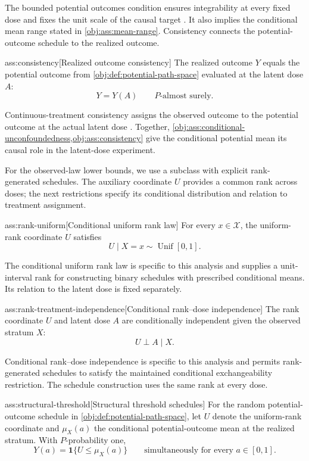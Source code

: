 \documentclass[11pt]{article}
\begin{document}
The bounded potential outcomes condition ensures integrability at every fixed dose and fixes the unit scale of the causal target \citep{HuangZhang2023}. It also implies the conditional mean range stated in \cref{obj:ass:mean-range}. Consistency connects the potential-outcome schedule to the realized outcome.

\begin{assumptionv}{ass:consistency}[Realized outcome consistency]
The realized outcome \(Y\) equals the potential outcome from \cref{obj:def:potential-path-space} evaluated at the latent dose \(A\):
\[
Y=Y(A)\qquad P\text{-almost surely}.
\]
\end{assumptionv}

Continuous-treatment consistency assigns the observed outcome to the potential outcome at the actual latent dose \citep{HuangZhang2023}. Together, \cref{obj:ass:conditional-unconfoundedness,obj:ass:consistency} give the conditional potential mean its causal role in the latent-dose experiment.

For the observed-law lower bounds, we use a subclass with explicit rank-generated schedules. The auxiliary coordinate \(U\) provides a common rank across doses; the next restrictions specify its conditional distribution and relation to treatment assignment.

\begin{assumptionv}{ass:rank-uniform}[Conditional uniform rank law]
For every \(x\in\mathcal X\), the uniform-rank coordinate \(U\) satisfies
\[
U\mid X=x\sim\operatorname{Unif}[0,1].
\]
\end{assumptionv}

The conditional uniform rank law is specific to this analysis and supplies a unit-interval rank for constructing binary schedules with prescribed conditional means. Its relation to the latent dose is fixed separately.

\begin{assumptionv}{ass:rank-treatment-independence}[Conditional rank–dose independence]
The rank coordinate \(U\) and latent dose \(A\) are conditionally independent given the observed stratum \(X\):
\[
U\perp A\mid X.
\]
\end{assumptionv}

Conditional rank–dose independence is specific to this analysis and permits rank-generated schedules to satisfy the maintained conditional exchangeability restriction. The schedule construction uses the same rank at every dose.

\begin{assumptionv}{ass:structural-threshold}[Structural threshold schedules]
For the random potential-outcome schedule in \cref{obj:def:potential-path-space}, let \(U\) denote the uniform-rank coordinate and \(\mu_X(a)\) the conditional potential-outcome mean at the realized stratum. With \(P\)-probability one,
\[
Y(a)=\mathbf 1\{U\le \mu_X(a)\}
\qquad
\text{simultaneously for every }a\in[0,1].
\]
\end{assumptionv}
\end{document}
